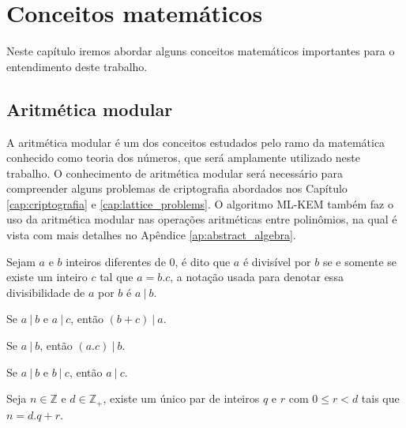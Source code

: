 
\chapter{Conceitos matemáticos}
\label{ap:conceitos_matematicos}

Neste capítulo iremos abordar alguns conceitos matemáticos importantes para o entendimento deste trabalho.

\section{Aritmética modular}
    A aritmética modular é um dos conceitos estudados pelo ramo da matemática conhecido como teoria dos números, que será amplamente utilizado neste trabalho. O conhecimento de aritmética modular será necessário para compreender alguns problemas de criptografia abordados nos Capítulo \ref{cap:criptografia} e \ref{cap:lattice_problems}. O algoritmo \ac{ML-KEM} também faz o uso da aritmética modular nas operações aritméticas entre polinômios, na qual é vista com mais detalhes no Apêndice \ref{ap:abstract_algebra}.

\begin{definition}[divisibilidade]
 Sejam $a$ e $b$ inteiros diferentes de $0$, é dito que $a$ é divisível por $b$ se e somente se existe um inteiro $c$ tal que $a = b.c$, a notação usada para denotar essa divisibilidade de $a$ por $b$ é $a\:|\:b$.
 \end{definition}

\begin{theorem}
    Se $a\:|\:b$ e $a\:|\:c$, então $(b + c)\:|\:a$.
\end{theorem}

\begin{theorem}
    Se $a\:|\:b$, então $(a.c)\:|\:b$.
\end{theorem}

\begin{theorem}
    Se $a\:|\:b$ e $b\:|\:c$, então $a\:|\:c$.
\end{theorem}

\begin{theorem}
Seja $n \in \mathbb{Z}$ e $d \in \mathbb{Z}_{+}$, existe um único par de inteiros $q$ e $r$ com $0 \leq r < d$ tais que $n = d.q + r$.
\end{theorem}

